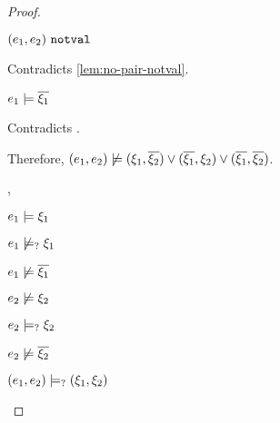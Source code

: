 \begin{proof}
\begin{byCases}
\begin{byCases}
\begin{byCases}
\begin{byCases}
\begin{byCases}
\begin{byCases}
                    \item[\text{(\ref{rule:CSNotValPair})}]
                        \begin{pfsteps*}
                        \item $(e_1 , e_2) ~\mathtt{notval}$ 
                        \end{pfsteps*}
                        Contradicts \autoref{lem:no-pair-notval}.
                    \item[\text{(\ref{rule:CSPair})}]
                        \begin{pfsteps*}
                        \item $e_1 \models \overline{\xi_1}$ 
                        \end{pfsteps*}
                        Contradicts .
                    \end{byCases}
                \end{byCases}
            \end{byCases}
            Therefore, $(e_1 , e_2) \not\models (\xi_1 , \overline{\xi_2}) \vee (\overline{\xi_1} , \xi_2) \vee (\overline{\xi_1} , \overline{\xi_2})$.
        \item[\csatisfy{e_1}{\xi_1},\cmaysatisfy{e_2}{\xi_2}]
            \begin{pfsteps*}
            \item $e_1 \models \xi_1$  
            \item $e_1 \not\models_{?} \xi_1$  
            \item $e_1 \not\models \overline{\xi_1}$  
            \item $e_2 \not\models \xi_2$  
            \item $e_2 \models_{?} \xi_2$  
            \item $e_2 \not\models \overline{\xi_2}$  
            \item $(e_1 , e_2) \models_{?} (\xi_1 , \xi_2)$ 
            \end{pfsteps*}

\end{byCases}
\end{byCases}
\end{byCases}
\end{proof}
